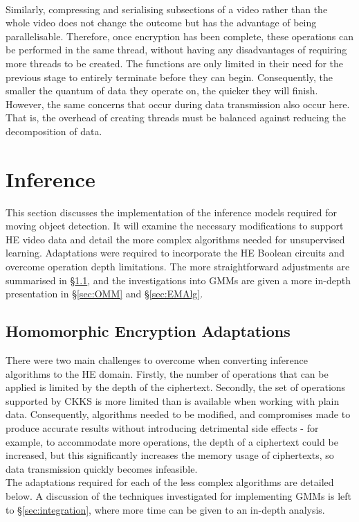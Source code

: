 \smallskip \\ \indent
Similarly, compressing and serialising subsections of a video rather than the whole video does not change the outcome but has the advantage of being parallelisable. Therefore, once encryption has been complete, these operations can be performed in the same thread, without having any disadvantages of requiring more threads to be created. The functions are only limited in their need for the previous stage to entirely terminate before they can begin. Consequently, the smaller the quantum of data they operate on, the quicker they will finish. However, the same concerns that occur during data transmission also occur here. That is, the overhead of creating threads must be balanced against reducing the decomposition of data.

\setlength{\leftskip}{0cm}




\section{Inference}
\label{sec:inference}
\setlength{\leftskip}{0.25cm}
\indent \indent
This section discusses the implementation of the inference models required for moving object detection. It will examine the necessary modifications to support HE video data and detail the more complex algorithms needed for unsupervised learning. Adaptations were required to incorporate the HE Boolean circuits and overcome operation depth limitations. The more straightforward adjustments are summarised in §\ref{sec:adaptations}, and the investigations into GMMs are given a more in-depth presentation in §\ref{sec:OMM} and §\ref{sec:EMAlg}.

\setlength{\leftskip}{0cm}
\subsection{Homomorphic Encryption Adaptations}
\label{sec:adaptations}
\setlength{\leftskip}{0.5cm}
\indent \indent
There were two main challenges to overcome when converting inference algorithms to the HE domain. Firstly, the number of operations that can be applied is limited by the depth of the ciphertext. Secondly, the set of operations supported by CKKS is more limited than is available when working with plain data. Consequently, algorithms needed to be modified, and compromises made to produce accurate results without introducing detrimental side effects - for example, to accommodate more operations, the depth of a ciphertext could be increased, but this significantly increases the memory usage of ciphertexts, so data transmission quickly becomes infeasible.
\smallskip \\ \indent
The adaptations required for each of the less complex algorithms are detailed below. A discussion of the techniques investigated for implementing GMMs is left to §\ref{sec:integration}, where more time can be given to an in-depth analysis.

